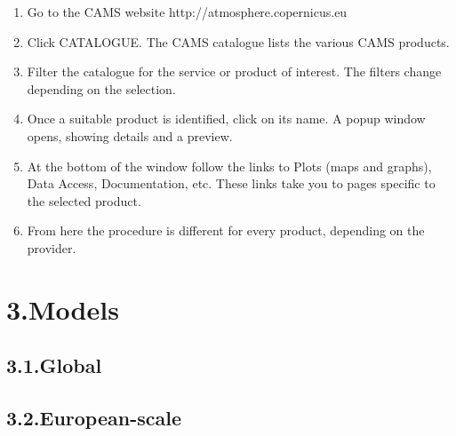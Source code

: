 \documentclass[9pt]{report}
\begin{document}
\begin{enumerate}[noitemsep,topsep=\mdcompacttopsep]%

\item{}Go to the CAMS website http://atmosphere.copernicus.eu%

\item{}Click CATALOGUE. The CAMS catalogue lists the various CAMS products.%

\item{}Filter the catalogue for the service or product of interest. The filters change depending on the selection.%

\item{}Once a suitable product is identified, click on its name. A popup window opens, showing details and a preview.%

\item{}At the bottom of the window follow the links to Plots (maps and graphs), Data Access, Documentation, etc. These links take you to pages specific to the selected product.%

\item{}From here the procedure is different for every product, depending on the provider.%
\end{enumerate}%

\section{3.\hspace*{0.5em}Models}\label{sec-models}%

\subsection{3.1.\hspace*{0.5em}Global}\label{sec-global}%

\subsection{3.2.\hspace*{0.5em}European-scale}\label{sec-european-scale}%
\end{document}
